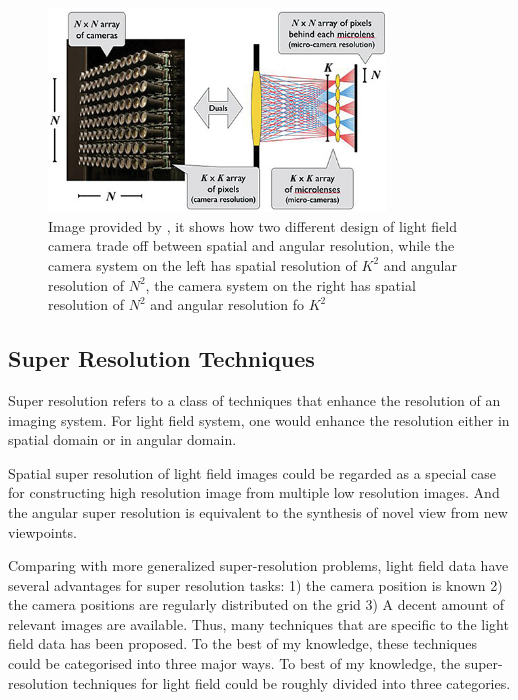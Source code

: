 \documentclass[11pt]{article}
\begin{document}
\begin{figure}
  \centering
  \captionsetup{width=0.8\linewidth}
  \includegraphics[width=0.8\textwidth]{./light-field-trade-off.jpg}
  \caption{
    Image provided by \cite{imtradoff}, it shows how two different design of
    light field camera trade off between spatial and angular resolution, while
    the camera system on the left has spatial resolution of $K^2$ and angular
    resolution of $N^2$, the camera system on the right has spatial resolution
    of $N^2$ and angular resolution fo $K^2$
  }
\end{figure}

\subsection*{Super Resolution Techniques}

Super resolution refers to a class of techniques that enhance the resolution of
an imaging system. For light field system, one would enhance the resolution
either in spatial domain or in angular domain.

Spatial super resolution of light field images could be regarded as a special
case for constructing high resolution image from multiple low resolution images.
And the angular super resolution is equivalent to the synthesis of novel view
from new viewpoints.

Comparing with more generalized super-resolution problems, light field data have
several advantages for super resolution tasks: 1) the camera position is known
2) the camera positions are regularly distributed on the grid 3) A decent amount
of relevant images are available. Thus, many techniques that are specific to the
light field data has been proposed. To the best of my knowledge, these
techniques could be categorised into three major ways.  To best of my knowledge,
the super-resolution techniques for light field could be roughly divided into
three categories.
\end{document}
